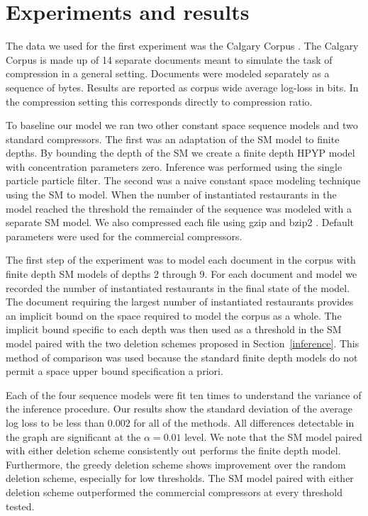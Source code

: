 \section{Experiments and results}
\label{results}

The data we used for the first experiment was the Calgary Corpus \cite{calgary corp}.  The Calgary Corpus is made up of 14 separate documents meant to simulate the task of compression in a general setting. Documents were modeled separately as a sequence of bytes.  Results are reported as corpus wide average log-loss in bits.  In the compression setting this corresponds directly to compression ratio.


To baseline our model we ran two other constant space sequence models and two standard compressors.  The first was an adaptation of the SM model to finite depths.  By bounding the depth of the SM we create a finite depth HPYP model with concentration parameters zero.  Inference was performed using the single particle particle filter. The second was a naive constant space modeling technique using the SM to model.  When the number of instantiated restaurants in the model reached the threshold the remainder of the sequence was modeled with a separate SM model.  We also compressed each file using gzip and bzip2 \cite{gzip} \cite{bzip2}.  Default parameters were used for the commercial compressors.

The first step of the experiment was to model each document in the corpus with finite depth SM models of depths 2 through 9.  For each document and model we recorded the number of instantiated restaurants in the final state of the model.  The document requiring the largest number of instantiated restaurants provides an implicit bound on the space required to model the corpus as a whole. The implicit bound specific to each depth was then used as a threshold in the SM model paired with the two deletion schemes proposed in Section~\ref{inference}. This method of comparison was used because the standard finite depth models do not permit a space upper bound specification a priori.

Each of the four sequence models were fit ten times to understand the variance of the inference procedure.  Our results show the standard deviation of the average log loss to be less than $0.002$ for all of the methods.  All differences detectable in the graph are significant at the $\alpha = 0.01$ level. We note that the SM model paired with either deletion scheme consistently out performs the finite depth model.  Furthermore, the greedy deletion scheme shows improvement over the random deletion scheme, especially for low thresholds.  The SM model paired with either deletion scheme outperformed the commercial compressors at every threshold tested.